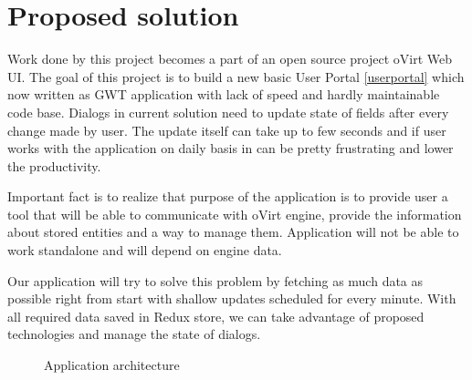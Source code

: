 \chapter{Proposed solution}
Work done by this project becomes a part of an open source project oVirt Web UI. The goal of this project is to build a new basic User Portal \ref{userportal} which now written as GWT\cite{gwt} application with lack of speed and hardly maintainable code base. Dialogs in current solution need to update state of fields after every change made by user. The update itself can take up to few seconds and if user works with the application on daily basis in can be pretty frustrating and lower the productivity.

Important fact is to realize that purpose of the application is to provide user a tool that will be able to communicate with oVirt engine, provide the information about stored entities and a way to manage them. Application will not be able to work standalone and will depend on engine data.

Our application will try to solve this problem by fetching as much data as possible right from start with shallow updates scheduled for every minute. With all required data saved in Redux store, we can take advantage of proposed technologies and manage the state of dialogs.

\begin{figure}[h]
\caption{Application architecture}
\label{vector}
\end{figure}

